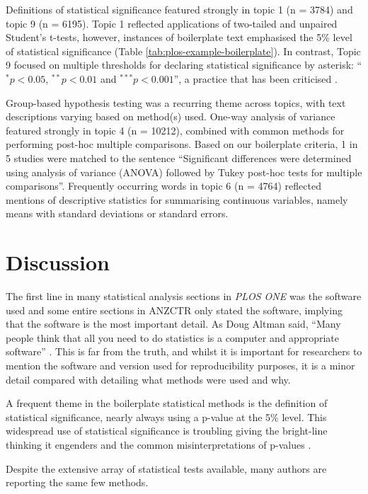 \documentclass[12pt]{article}
\begin{document}
Definitions of statistical significance featured strongly in topic 1 (n
= 3784) and topic 9 (n = 6195). Topic 1 reflected
applications of two-tailed and unpaired Student's t-tests, however,
instances of boilerplate text emphasised the 5\% level of statistical
significance (Table \ref{tab:plos-example-boilerplate}). In contrast, Topic 9
focused on multiple thresholds for declaring statistical significance by
asterisk: ``\(^{*}p<0.05\), \(^{**}p<0.01\) and \(^{***}p<0.001\)'', a
practice that has been criticised \citep{Wasserstein2019}.

Group-based hypothesis testing was a recurring theme across topics, with
text descriptions varying based on method(s) used. One-way analysis of
variance featured strongly in topic 4 (n = 10212), combined
with common methods for performing post-hoc multiple comparisons. Based
on our boilerplate criteria, 1 in 5 studies were matched to the sentence
``Significant differences were determined using analysis of variance
(ANOVA) followed by Tukey post-hoc tests for multiple comparisons''.
Frequently occurring words in topic 6 (n = 4764) reflected
mentions of descriptive statistics for summarising continuous variables,
namely means with standard deviations or standard errors.

\hypertarget{discussion}{%
\section{Discussion}\label{discussion}}

The first line in many statistical analysis sections in \emph{PLOS ONE}
was the software used and some entire sections in ANZCTR only stated the
software, implying that the software is the most important detail. As
Doug Altman said, ``Many people think that all you need to do statistics
is a computer and appropriate software'' \citep{Altman1994}. This is far
from the truth, and whilst it is important for researchers to mention
the software and version used for reproducibility purposes, it is a
minor detail compared with detailing what methods were used and why.

A frequent theme in the boilerplate statistical methods is the
definition of statistical significance, nearly always using a p-value at
the 5\% level. This widespread use of statistical significance is
troubling giving the bright-line thinking it engenders
\citep{McShane2019} and the common misinterpretations of p-values
\citep{Goodman2008}.

Despite the extensive array of statistical tests available, many authors
are reporting the same few methods.
\end{document}
